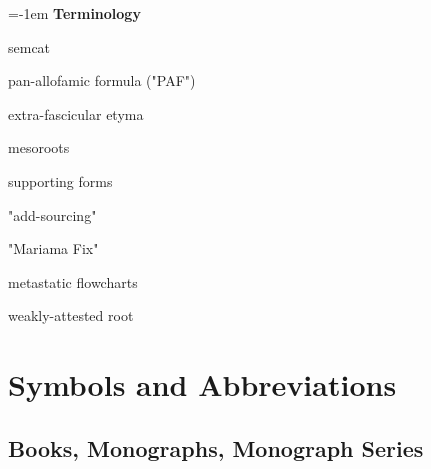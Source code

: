 {\large \parindent=-1em \textbf{Terminology}}
\vspace{0.25em}

semcat

pan-allofamic formula ("PAF")

extra-fascicular etyma

mesoroots

supporting forms

"add-sourcing"

"Mariama Fix"

metastatic flowcharts

weakly-attested root

\chapter{Symbols and Abbreviations}

\renewcommand\thefootnote{*}
\section*{Books, Monographs, Monograph Series\footnotemark}
\renewcommand\thefootnote{\arabic{footnote}} %
\setcounter{footnote}{0}

